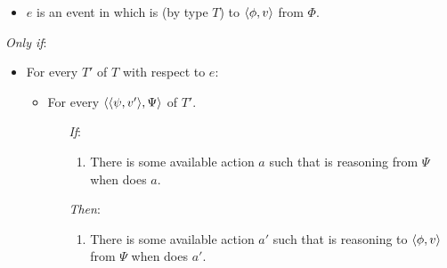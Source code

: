 \begin{note}
  \begin{definition}[\tR{2}]
    \label{def:cmptnc}

    \noindent%

    \begin{itemize}
    \item
      \(e\) is an event in which \vAgent{} is \emph{} (by type \(T\)) to \(\langle \phi, v \rangle\) from \(\Phi\).
    \end{itemize}

    \emph{Only if}:

    \begin{itemize}[noitemsep]
    \item
      For every  \(T'\) of \(T\) with respect to \(e\):
      \begin{itemize}[noitemsep]
      \item
        For every \tI{} \(\langle \langle \psi, v' \rangle, \Psi \rangle\) of \(T'\).
        \begin{itemize}[noitemsep]
        \item[\emph{If}:]
          \begin{enumerate}[label=\alph*., ref=(\alph*), series=tRSketch]
          \item
            There is some available action \(a\) such that \vAgent{} is reasoning from \(\Psi\) when \vAgent{} does \(a\).
          \end{enumerate}
        \item[\emph{Then}:]
          \begin{enumerate}[label=\alph*., ref=(\alph*), resume*=tRSketch]
          \item
            There is some available action \(a'\) such that \vAgent{} is reasoning to \(\langle \phi, v \rangle\) from \(\Psi\) when \vAgent{} does \(a'\).
          \end{enumerate}
        \end{itemize}
      \end{itemize}
    \end{itemize}
    \vspace{-\baselineskip}
  \end{definition}


\end{note}
